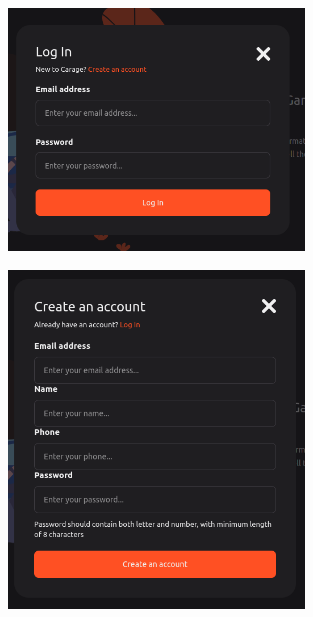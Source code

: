 \documentclass[a4paper]{report}
\begin{document}
\begin{figure}[H]
\centering
\begin{minipage}{.5\textwidth}
  \centering
    \includegraphics[width=0.7\textwidth]{images/homepage_signin.png}
\end{minipage}%
\begin{minipage}{.5\textwidth}
  \centering
    \includegraphics[width=0.7\textwidth]{images/homepage_signup.png}
    \label{img:Frame40}
\end{minipage}%
\end{figure}
\end{document}
